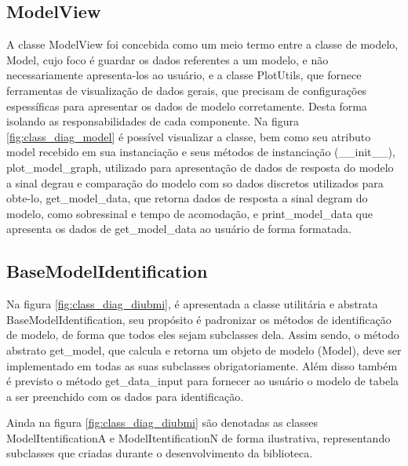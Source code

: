 \subsection{ModelView}

A classe ModelView foi concebida como um meio termo entre a classe de modelo, Model, cujo foco é guardar os dados
referentes a um modelo, e não necessariamente apresenta-los ao usuário, e a classe PlotUtils, que fornece ferramentas
de visualização de dados gerais, que precisam de configurações espessíficas para apresentar os dados de modelo
corretamente.
Desta forma isolando as responsabilidades de cada componente.
Na figura \ref{fig:class_diag_model} é possível visualizar a classe, bem como seu atributo model recebido em sua
instanciação e seus métodos de instanciação (\_\_init\_\_), plot\_model\_graph, utilizado para apresentação de dados de
resposta do modelo a sinal degrau e comparação do modelo com so dados discretos utilizados para obte-lo,
get\_model\_data, que retorna dados de resposta a sinal degram do modelo, como sobressinal e tempo de acomodação, e
print\_model\_data que apresenta os dados de get\_model\_data ao usuário de forma formatada.

\subsection{BaseModelIdentification}

Na figura \ref{fig:class_diag_diubmi}, é apresentada a classe utilitária e abstrata BaseModelIdentification, seu
propósito é padronizar os métodos de identificação de modelo, de forma que todos eles sejam subclasses dela.
Assim sendo, o método abstrato get\_model, que calcula e retorna um objeto de modelo (Model), deve ser implementado em
todas as suas subclasses obrigatoriamente.
Além disso também é previsto o método get\_data\_input para fornecer ao usuário o modelo de tabela a ser preenchido
com os dados para identificação.

Ainda na figura \ref{fig:class_diag_diubmi} são denotadas as classes ModelItentificationA e ModelItentificationN de
forma ilustrativa, representando subclasses que criadas durante o desenvolvimento da biblioteca.

